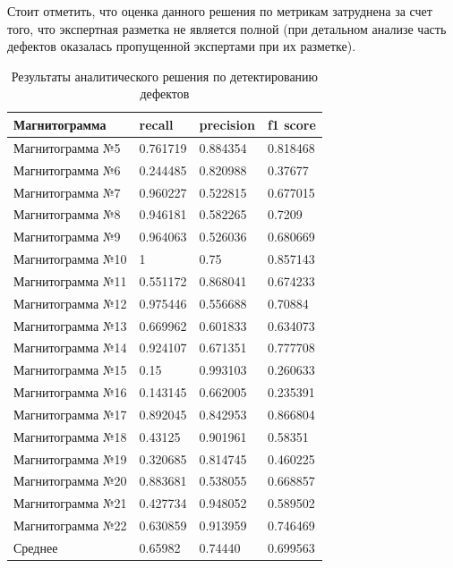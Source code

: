 \documentclass[a4paper,article,14pt]{extarticle}
\begin{document}
Стоит отметить, что оценка данного решения по метрикам затруднена за счет того, 
что экспертная разметка не является полной (при детальном анализе часть дефектов оказалась 
пропущенной экспертами при их разметке).

\begin{center}
    \begin{longtable}{|p{5cm}|p{3cm}|p{3cm}|p{3cm}|}
        \caption{Результаты аналитического решения по детектированию дефектов} \\ \hline
        Магнитограмма	& recall	& precision & f1 score \\ \hline
        Магнитограмма №5	& 0.761719	& 0.884354 & 0.818468 \\ \hline
        Магнитограмма №6	& 0.244485	& 0.820988 & 0.37677 \\ \hline
        Магнитограмма №7	& 0.960227	& 0.522815 & 0.677015 \\ \hline
        Магнитограмма №8	& 0.946181	& 0.582265 & 0.7209 \\ \hline
        Магнитограмма №9	& 0.964063	& 0.526036 & 0.680669 \\ \hline
        Магнитограмма №10	& 1	        & 0.75 & 0.857143 \\ \hline
        Магнитограмма №11	& 0.551172	& 0.868041 & 0.674233 \\ \hline
        Магнитограмма №12	& 0.975446	& 0.556688 & 0.70884 \\ \hline
        Магнитограмма №13	& 0.669962	& 0.601833 & 0.634073 \\ \hline
        Магнитограмма №14	& 0.924107	& 0.671351 & 0.777708 \\ \hline
        Магнитограмма №15	& 0.15	    & 0.993103 & 0.260633 \\ \hline
        Магнитограмма №16	& 0.143145	& 0.662005 & 0.235391 \\ \hline
        Магнитограмма №17	& 0.892045	& 0.842953 & 0.866804 \\ \hline
        Магнитограмма №18	& 0.43125	& 0.901961 & 0.58351 \\ \hline
        Магнитограмма №19	& 0.320685	& 0.814745 & 0.460225 \\ \hline
        Магнитограмма №20	& 0.883681	& 0.538055 & 0.668857 \\ \hline
        Магнитограмма №21	& 0.427734	& 0.948052 & 0.589502 \\ \hline
        Магнитограмма №22	& 0.630859	& 0.913959 & 0.746469\\ \hline
        Среднее	& 0.65982	& 0.74440 & 0.699563 \\ \hline
    \end{longtable}
\end{center}
\end{document}
